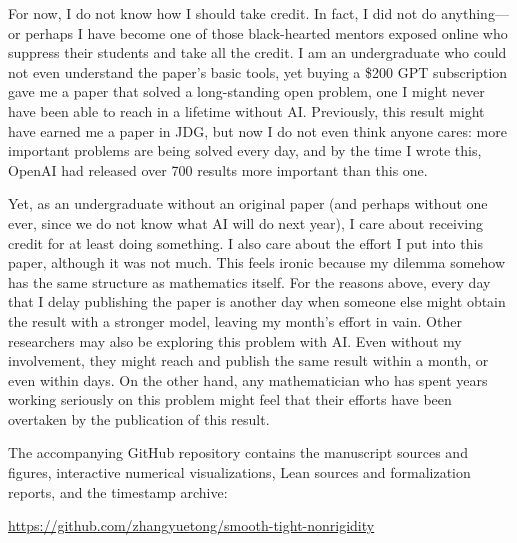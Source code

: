 For now, I do not know how I should take credit. In fact, I did not
do anything---or perhaps I have become one of those black-hearted
mentors exposed online who suppress their students and take all the
credit. I am an undergraduate who could not even understand the paper's
basic tools, yet buying a \$200 GPT subscription gave me a paper that
solved a long-standing open problem, one I might never have been able
to reach in a lifetime without AI. Previously, this result might have
earned me a paper in JDG, but now I do not even think anyone cares:
more important problems are being solved every day, and by the time
I wrote this, OpenAI had released over 700 results more important than
this one.

Yet, as an undergraduate without an original paper (and perhaps without
one ever, since we do not know what AI will do next year), I care about
receiving credit for at least doing something. I also care about the
effort I put into this paper, although it was not much. This feels
ironic because my dilemma somehow has the same structure as mathematics
itself. For the reasons above, every day that I delay publishing the
paper is another day when someone else might obtain the result with
a stronger model, leaving my month's effort in vain. Other researchers may also be exploring this problem with AI. Even
without my involvement, they might reach and publish the same result
within a month, or even within days. On the other hand, any mathematician
who has spent years working seriously on this problem might feel that
their efforts have been overtaken by the publication of this result.

The accompanying GitHub repository contains the manuscript sources and
figures, interactive numerical visualizations, Lean sources and
formalization reports, and the timestamp archive:

\noindent\url{https://github.com/zhangyuetong/smooth-tight-nonrigidity}
